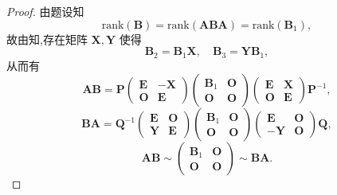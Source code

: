 \documentclass[../../main.tex]{subfiles}
\begin{document}
\begin{proof}
由题设知
\[
\mathrm{rank}(\boldsymbol{B}) = \mathrm{rank}(\boldsymbol{ABA}) = \mathrm{rank}(\boldsymbol{B}_1),
\]
故由知,存在矩阵 \( \boldsymbol{X}, \boldsymbol{Y} \) 使得
\[
\boldsymbol{B}_2 = \boldsymbol{B}_1\boldsymbol{X}, \quad \boldsymbol{B}_3 = \boldsymbol{Y}\boldsymbol{B}_1,
\]
从而有
\[
\boldsymbol{AB} = \boldsymbol{P} \begin{pmatrix} \boldsymbol{E} & -\boldsymbol{X} \\ \boldsymbol{O} & \boldsymbol{E} \end{pmatrix} \begin{pmatrix} \boldsymbol{B}_1 & \boldsymbol{O} \\ \boldsymbol{O} & \boldsymbol{O} \end{pmatrix} \begin{pmatrix} \boldsymbol{E} & \boldsymbol{X} \\ \boldsymbol{O} & \boldsymbol{E} \end{pmatrix} \boldsymbol{P}^{-1},
\]
\[
\boldsymbol{BA} = \boldsymbol{Q}^{-1} \begin{pmatrix} \boldsymbol{E} & \boldsymbol{O} \\ \boldsymbol{Y} & \boldsymbol{E} \end{pmatrix} \begin{pmatrix} \boldsymbol{B}_1 & \boldsymbol{O} \\ \boldsymbol{O} & \boldsymbol{O} \end{pmatrix} \begin{pmatrix} \boldsymbol{E} & \boldsymbol{O} \\ -\boldsymbol{Y} & \boldsymbol{O} \end{pmatrix} \boldsymbol{Q},
\]
\[
\boldsymbol{AB} \sim \begin{pmatrix} \boldsymbol{B}_1 & \boldsymbol{O} \\ \boldsymbol{O} & \boldsymbol{O} \end{pmatrix} \sim \boldsymbol{BA}.
\]
\end{proof}
\end{document}
